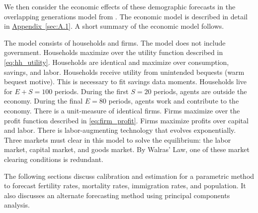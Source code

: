 \documentclass[10pt]{article}
\renewcommand{\thesection}{\arabic{section}}
\renewcommand{\thesubsection}{\thesection.\arabic{subsection}}
\renewcommand{\thesubsubsection}{\thesubsection.\arabic{subsubsection}}
\newcommand{\aref}[1]{\hyperref[#1]{Appendix~\ref{#1}}}
\renewcommand{\subsection}[2][]{\oldsubsection[#1]{#2}\index{#1}\label{sec:\thesubsection}}
\renewcommand{\subsubsection}[2][]{\oldsubsubsection[#1]{#2}\index{#1}\label{sec:\thesubsubsection}}
\numberwithin{equation}{subsection}
\begin{document}
\par We then consider the economic effects of these demographic forecasts in the overlapping generations model from \cite{E2020}. The economic model is described in detail in \aref{sec:A.1}. A short summary of the economic model follows.

\par The model consists of households and firms. The model does not include government. Households maximize over the utility function described in \ref{eq:hh_utility}. Households are identical and maximize over consumption, savings, and labor. Households receive utility from unintended bequests (warm bequest motive). This is necessary to fit savings data moments. Households live for \(E+S=100\) periods. During the first \(S=20\) periods, agents are outside the economy. During the final \(E=80\) periods, agents work and contribute to the economy. There is a unit-measure of identical firms. Firms maximize over the profit function described in \ref{eq:firm_profit}. Firms maximize profits over capital and labor. There is labor-augmenting technology that evolves exponentially. Three markets must clear in this model to solve the equilibrium: the labor market, capital market, and goods market. By Walras' Law, one of these market clearing conditions is redundant.


\subsection{Forecasting Demographics}

\par The following sections discuss calibration and estimation for a parametric method to forecast fertility rates, mortality rates, immigration rates, and population. It also discusses an alternate forecasting method using principal components analysis.

\end{document}

